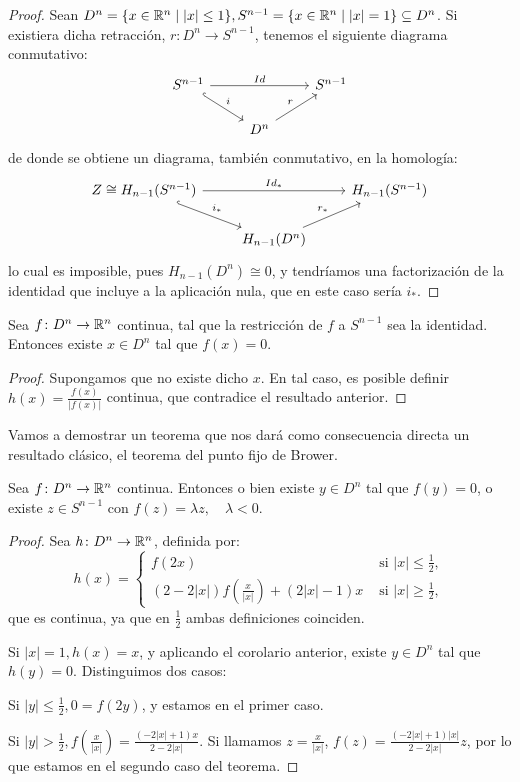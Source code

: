 \begin{proof}
  Sean $D^n = \{x \in \mathbb{R}^n \mid |x| \leq 1\}, S^{n-1} = \{x \in \mathbb{R}^n \mid |x| = 1\} \subseteq D^n$. Si existiera dicha retracción,
  $r \colon D^n \to S^{n-1}$, tenemos el siguiente diagrama conmutativo:
  \[ \begin{tikzcd}
    S^{n-1} \arrow[hookrightarrow]{dr}{i} \arrow{rr}{Id} & & S^{n-1} \\
    & D^n \arrow{ur}{r}
  \end{tikzcd} \]
  de donde se obtiene un diagrama, también conmutativo, en la homología:
  \[ \begin{tikzcd}
    Z \cong H_{n-1}(S^{n-1}) \arrow[hookrightarrow]{dr}{i_*} \arrow{rr}{Id_*} & & H_{n-1}(S^{n-1}) \\
    & H_{n-1}(D^n) \arrow{ur}{r_*}
  \end{tikzcd} \]
  lo cual es imposible, pues $H_{n-1}(D^n) \cong 0$, y tendríamos una factorización de la identidad que incluye a la aplicación nula,
  que en este caso sería $i_*$.
\end{proof}

\begin{corollary}
  Sea $f \colon D^n \to \mathbb{R}^n$ continua, tal que la restricción de $f$ a $S^{n-1}$ sea la identidad.
  Entonces existe $x \in D^n$ tal que $f(x) = 0$.
\end{corollary}

\begin{proof}
  Supongamos que no existe dicho $x$. En tal caso, es posible definir $h(x) = \frac{f(x)}{|f(x)|}$
  continua, que contradice el resultado anterior.
\end{proof}

Vamos a demostrar un teorema que nos dará como consecuencia directa un resultado clásico, el teorema
del punto fijo de Brower.

\begin{theorem}
  Sea $f \colon D^n \to \mathbb{R}^n$ continua. Entonces o bien existe $y \in D^n$ tal que $f(y) = 0$, o existe
  $z \in S^{n-1}$ con $f(z) = \lambda z, \quad \lambda < 0$.
\end{theorem}

\begin{proof}
  Sea $h \colon D^n \to \mathbb{R}^n$, definida por:
  \[ h(x) = \begin{cases} f(2x) &\text{ si } |x| \leq \frac{1}{2}, \\
                          (2-2|x|)f(\frac{x}{|x|}) + (2|x| - 1)x &\text{ si } |x| \geq \frac{1}{2}, \end{cases} \]
  que es continua, ya que en $\frac{1}{2}$ ambas definiciones coinciden.

  Si $|x| = 1, h(x) = x$, y aplicando el corolario anterior, existe $y \in D^n$ tal que $h(y) = 0$. Distinguimos dos casos:

  Si $|y| \leq \frac{1}{2}, 0 = f(2y)$, y estamos en el primer caso.

  Si $|y| > \frac{1}{2}, f(\frac{x}{|x|}) = \frac{(-2|x| + 1)x}{2-2|x|}$. Si llamamos $z = \frac{x}{|x|}$,
  $f(z) = \frac{(-2|x|+1)|x|}{2-2|x|} z$, por lo que estamos en el segundo caso del teorema.
\end{proof}

